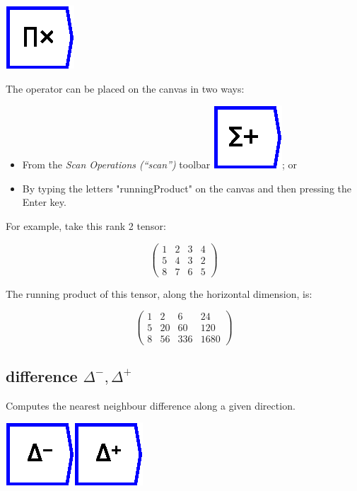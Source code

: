 \includegraphics{images/runningProduct}

The operator can be placed on the canvas in two ways:
\begin{itemize}
\item From the \emph{Scan Operations (``scan'')} toolbar \includegraphics{images/runningSum};
or 
\item By typing the letters "runningProduct" on the canvas and then pressing
the Enter key.
\end{itemize}
For example, take this rank 2 tensor:

\[
\left(\begin{array}{cccc}
1 & 2 & 3 & 4\\
5 & 4 & 3 & 2\\
8 & 7 & 6 & 5
\end{array}\right)
\]

The running product of this tensor, along the horizontal dimension,
is:

\[
\left(\begin{array}{cccc}
1 & 2 & 6 & 24\\
5 & 20 & 60 & 120\\
8 & 56 & 336 & 1680
\end{array}\right)
\]


\subsection{difference $\Delta^{-},\Delta^{+}$}

\label{Operation:difference}\label{Operation:differencePlus} Computes
the nearest neighbour difference along a given direction.

\includegraphics{images/difference}\includegraphics{images/differencePlus}


